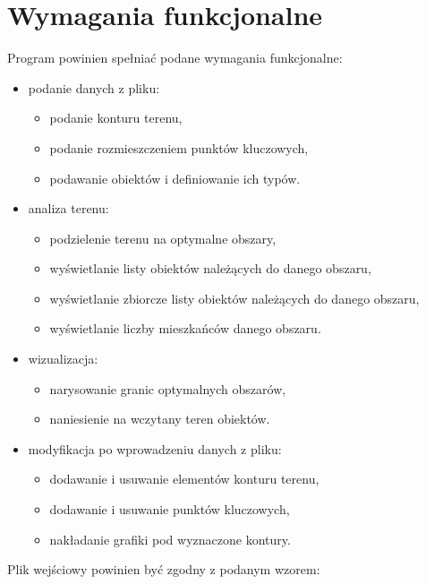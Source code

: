 \documentclass[a4paper,11pt]{article}
\begin{document}
\section{Wymagania funkcjonalne}
\noindent
Program powinien spełniać podane wymagania funkcjonalne:
\begin{itemize}
\item podanie danych z pliku:
\begin{itemize}
\item podanie konturu terenu,
\item podanie rozmieszczeniem punktów kluczowych,
\item podawanie obiektów i definiowanie ich typów.
\end{itemize}
\item analiza terenu:
\begin{itemize}
\item podzielenie terenu na optymalne obszary,
\item wyświetlanie listy obiektów należących do danego obszaru,
\item wyświetlanie zbiorcze listy obiektów należących do danego obszaru,
\item wyświetlanie liczby mieszkańców danego obszaru.
\end{itemize}
\item wizualizacja:
\begin{itemize}
\item narysowanie granic optymalnych obszarów,
\item naniesienie na wczytany teren obiektów.
\end{itemize}
\item modyfikacja po wprowadzeniu danych z pliku:
\begin{itemize}
\item dodawanie i usuwanie elementów konturu terenu,
\item dodawanie i usuwanie punktów kluczowych,
\item nakładanie grafiki pod wyznaczone kontury.
\end{itemize}
\end{itemize}

Plik wejściowy powinien być zgodny z podanym wzorem:
\end{document}
